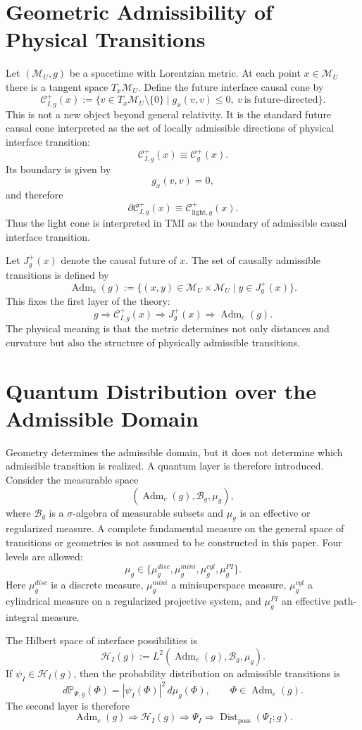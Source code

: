 \documentclass[12pt,a4paper]{article}
\DeclareMathOperator{\Adm}{Adm}
\DeclareMathOperator{\Dist}{Dist}
\newcommand{\M}{\mathcal M_U}
\newcommand{\Hilb}{\mathcal H}
\newcommand{\Prob}{\mathbb P}
\begin{document}
\section{Geometric Admissibility of Physical Transitions}
Let $(\M,g)$ be a spacetime with Lorentzian metric. At each point $x\in\M$ there is a tangent space $T_x\M$. Define the future interface causal cone by
\[
\boxed{
\mathcal C^{+}_{I,g}(x):=
\{v\in T_x\M\setminus\{0\}\mid g_x(v,v)\leq0,\ v\ \text{is future-directed}\}.
}
\]
This is not a new object beyond general relativity. It is the standard future causal cone interpreted as the set of locally admissible directions of physical interface transition:
\[
\boxed{\mathcal C^{+}_{I,g}(x)\equiv\mathcal C^{+}_{g}(x).}
\]
Its boundary is given by
\[
 g_x(v,v)=0,
\]
and therefore
\[
\boxed{\partial\mathcal C^{+}_{I,g}(x)\equiv\mathcal C^{+}_{\mathrm{light},g}(x).}
\]
Thus the light cone is interpreted in TMI as the boundary of admissible causal interface transition.

Let $J_g^+(x)$ denote the causal future of $x$. The set of causally admissible transitions is defined by
\[
\boxed{
\Adm_c(g):=\{(x,y)\in\M\times\M\mid y\in J_g^+(x)\}.
}
\]
This fixes the first layer of the theory:
\[
\boxed{g\Rightarrow\mathcal C^+_{I,g}(x)\Rightarrow J_g^+(x)\Rightarrow\Adm_c(g).}
\]
The physical meaning is that the metric determines not only distances and curvature but also the structure of physically admissible transitions.

\section{Quantum Distribution over the Admissible Domain}
Geometry determines the admissible domain, but it does not determine which admissible transition is realized. A quantum layer is therefore introduced. Consider the measurable space
\[
(\Adm_c(g),\mathcal B_g,\mu_g),
\]
where $\mathcal B_g$ is a $\sigma$-algebra of measurable subsets and $\mu_g$ is an effective or regularized measure. A complete fundamental measure on the general space of transitions or geometries is not assumed to be constructed in this paper. Four levels are allowed:
\[
\boxed{\mu_g\in\{\mu_g^{disc},\mu_g^{mini},\mu_g^{cyl},\mu_g^{PI}\}.}
\]
Here $\mu_g^{disc}$ is a discrete measure, $\mu_g^{mini}$ a minisuperspace measure, $\mu_g^{cyl}$ a cylindrical measure on a regularized projective system, and $\mu_g^{PI}$ an effective path-integral measure.

The Hilbert space of interface possibilities is
\[
\boxed{
\Hilb_I(g):=L^2(\Adm_c(g),\mathcal B_g,\mu_g).
}
\]
If $\psi_I\in\Hilb_I(g)$, then the probability distribution on admissible transitions is
\[
\boxed{
 d\Prob_{\Psi,g}(\Phi)=|\psi_I(\Phi)|^2\,d\mu_g(\Phi),\qquad \Phi\in\Adm_c(g).
}
\]
The second layer is therefore
\[
\boxed{\Adm_c(g)\Rightarrow\Hilb_I(g)\Rightarrow\Psi_I\Rightarrow\Dist_{\mathrm{poss}}(\Psi_I;g).}
\]
\end{document}
